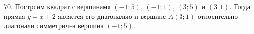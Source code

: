 70. Построим квадрат с вершинами $(-1;5),\ (-1;1),\ (3;5)$ и $(3;1).$ Тогда прямая $y=x+2$ является его диагональю и вершине $A(3;1)$ относительно диагонали симметрична вершина $(-1;5).$\\
